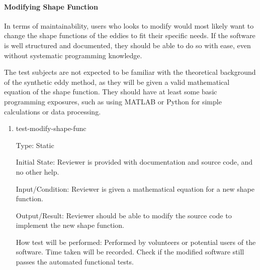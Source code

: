 \documentclass[12pt, titlepage]{article}
\begin{document}
\paragraph{Modifying Shape Function\\}
In terms of maintainability, users who looks to modify \progname{} would most likely want to change the shape functions of the eddies to fit their specific needs. If the software is well structured and documented, they should be able to do so with ease, even without systematic programming knowledge.

The test subjects are not expected to be familiar with the theoretical background of the synthetic eddy method, as they will be given a valid mathematical equation of the shape function. They should have at least some basic programming exposures, such as using MATLAB or Python for simple calculations or data processing.

\begin{enumerate}

\item{test-modify-shape-func\\}

Type: Static
					
Initial State: Reviewer is provided with documentation and source code, and no other help.
					
Input/Condition: Reviewer is given a mathematical equation for a new shape function.
					
Output/Result: Reviewer should be able to modify the source code to implement the new shape function.
					
How test will be performed: Performed by volunteers or potential users of the software. Time taken will be recorded. Check if the modified software still passes the automated functional tests.

\end{enumerate}

\newpage
\end{document}

